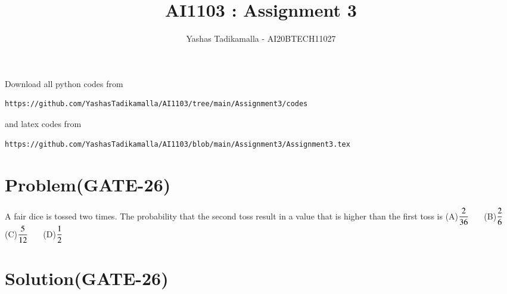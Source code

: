 \documentclass[journal,12pt,twocolumn]{IEEEtran}
\begin{document}
\let\vec\mathbf
\renewcommand{\thefigure}{\theproblem}
\def\putbox#1#2#3{\makebox[0in][l]{\makebox[#1][l]{}\raisebox{\baselineskip}[0in][0in]{\raisebox{#2}[0in][0in]{#3}}}}
     \def\rightbox#1{\makebox[0in][r]{#1}}
     \def\centbox#1{\makebox[0in]{#1}}
     \def\topbox#1{\raisebox{-\baselineskip}[0in][0in]{#1}}
     \def\midbox#1{\raisebox{-0.5\baselineskip}[0in][0in]{#1}}
\vspace{3cm}
\title{AI1103 : Assignment 3}
\author{Yashas Tadikamalla - AI20BTECH11027}
\maketitle
\newpage
\bigskip
\renewcommand{\thefigure}{\arabic{figure}}
\renewcommand{\thetable}{\arabic{table}}
Download all python codes from 
\begin{lstlisting}
https://github.com/YashasTadikamalla/AI1103/tree/main/Assignment3/codes
\end{lstlisting}
%
and latex codes from 
%
\begin{lstlisting}
https://github.com/YashasTadikamalla/AI1103/blob/main/Assignment3/Assignment3.tex
\end{lstlisting}
\section*{Problem(GATE-26)}

A fair dice is tossed two times. The probability that the second toss result in a value that is higher than the first toss is
\newline
\newline
(A)$\dfrac{2}{36}\hspace{0.5cm}$ (B)$\dfrac{2}{6}\hspace{0.5cm}$  (C)$\dfrac{5}{12}\hspace{0.5cm}$  (D)$\dfrac{1}{2}\hspace{0.5cm}$
\section*{Solution(GATE-26)}
\end{document}
